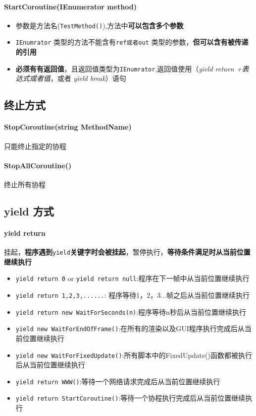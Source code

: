 \documentclass[UTF8,a4paper,12pt]{ctexbook}
\begin{document}
			\paragraph{StartCoroutine(IEnumerator method)}
				\begin{itemize}
					\item 参数是方法名(\verb|TestMethod()|),方法中\textbf{可以包含多个参数}
					\item \verb|IEnumrator| 类型的方法不能含有\verb|ref或者out| 类型的参数，\textbf{但可以含有被传递的引用}
					\item \textbf{必须有有返回值}，且返回值类型为\verb|IEnumrator|,返回值使用（\textit{yield retuen +表达式或者值}，或者 \textit{yield break}）语句	
			\end{itemize}
		
		\subsection{终止方式}
			\paragraph{StopCoroutine(string MethodName)}
				只能终止指定的协程
			
			\paragraph{StopAllCoroutine()}
				终止所有协程
				
		\subsection{yield 方式}
			\paragraph{yield return}
				挂起，\textbf{程序遇到}\verb|yield|\textbf{关键字时会被挂起}，暂停执行，\textbf{等待条件满足时从当前位置继续执行}
				
				\begin{itemize}
					\item \verb|yield return 0| or \verb|yield return null|:程序在下一帧中从当前位置继续执行
					\item \verb|yield return 1,2,3,......|: 程序等待1，2，3...帧之后从当前位置继续执行
					\item \verb|yield return new WaitForSeconds(n)|:程序等待n秒后从当前位置继续执行
					\item \verb|yield new WaitForEndOfFrame()|:在所有的渲染以及GUI程序执行完成后从当前位置继续执行
					\item \verb|yield new WaitForFixedUpdate()|:所有脚本中的FixedUpdate()函数都被执行后从当前位置继续执行
					\item \verb|yield return WWW()|:等待一个网络请求完成后从当前位置继续执行
					\item \verb|yield return StartCoroutine()|:等待一个协程执行完成后从当前位置继续执行
				\end{itemize}
			
\end{document}
